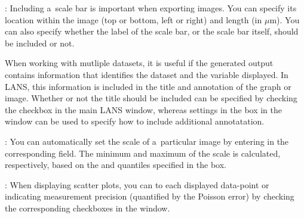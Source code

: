\bul {}: Including a~scale bar is important when exporting images. You can specify its location within the image (top or bottom, left or right) and length (in $\mu$m). You can also specify whether the label of the scale bar, or the scale bar itself, should be included or not.

\bul {} When working with mutliple datasets, it is useful if the generated output contains information that identifies the dataset and the variable displayed. In LANS, this information is included in the title and annotation of the graph or image. Whether or not the title should be included can be specified by checking the  checkbox in the main LANS window, whereas settings in the  box in the  window can be used to specify how to include additional annotatation.

\bul {}: You can automatically set the scale of a~particular image by entering \ttt{[auto]} in the corresponding  field. The minimum and maximum of the scale is calculated, respectively, based on the  and  quantiles specified in the  box. 

\bul {}: When displaying scatter plots, you can  to each displayed data-point or  indicating measurement precision (quantified by the Poisson error) by checking the corresponding checkboxes in the  window.


